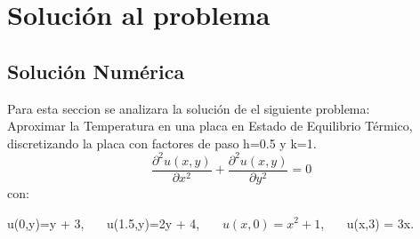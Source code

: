 \documentclass[11pt,a4paper]{article}
\begin{document}
\section{Solución al problema}

\subsection{Solución Numérica}
\thispagestyle{empty}
Para esta seccion se analizara la solución de el siguiente problema:\\
Aproximar la Temperatura en una placa en Estado de Equilibrio Térmico, discretizando la placa con factores de paso h=0.5 y k=1.\\
$$
\frac{\partial^2 u(x,y)}{\partial x^2} + \frac{\partial^2 u(x,y)}{\partial y^2} = 0
$$
con:

u(0,y)=y + 3,~~~  u(1.5,y)=2y + 4,~~~  $u(x,0) = x^2 + 1 $,~~~  u(x,3) = 3x.
\end{document}
